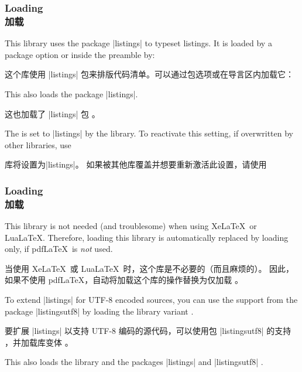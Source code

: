 \subsubsection{Loading \\加载 }

This library uses the package |listings|  to typeset
listings. It is loaded by a package option or inside the preamble by:

这个库使用 |listings| 包来排版代码清单。可以通过包选项或在导言区内加载它：
\begin{dispListing}
\end{dispListing}
This also loads the package |listings|.

这也加载了 |listings| 包 。

The  is set to |listings| by the library.
To reactivate this setting, if overwritten by other libraries, use

库将设置为|listings|。 如果被其他库覆盖并想要重新激活此设置，请使用
\begin{dispListing}
\end{dispListing}

\subsubsection{Loading \\加载 }
\begin{marker}
This library is not needed (and troublesome) when using Xe\LaTeX\ or Lua\LaTeX.
Therefore, loading this library is automatically replaced by loading
 only, if pdf\LaTeX\ is \emph{not} used.

当使用 Xe\LaTeX\ 或 Lua\LaTeX\ 时，这个库是不必要的（而且麻烦的）。 因此，如果不使用 pdf\LaTeX，自动将加载这个库的操作替换为仅加载 。
\end{marker}
To extend |listings| for UTF-8 encoded sources, you can use the support from
the package |listingsutf8| by loading the library
variant .

要扩展 |listings| 以支持 UTF-8 编码的源代码，可以使用包 |listingsutf8| 的支持 ，并加载库变体 。
\begin{dispListing}
\end{dispListing}
This also loads the library 
and the packages |listings|
and |listingsutf8| .

